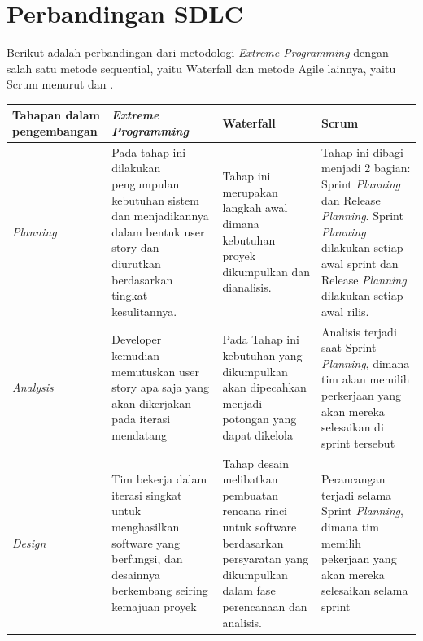 \section{Perbandingan SDLC}

\noindent Berikut adalah perbandingan dari metodologi \textit{Extreme Programming} dengan salah satu metode sequential, yaitu Waterfall dan metode Agile lainnya, yaitu Scrum menurut \textcite{inproc:fahrurrozi} dan \textcite{article:suryantara}. 

\begin{longtable}[!h]
        {
            p{}
            p{}
            p{}
            p{}
        }
        
        \toprule
        Tahapan dalam pengembangan & \textit{Extreme Programming} & Waterfall & Scrum \\ [0.5ex] 
        \midrule
        \textit{Planning} 
        & 
        Pada tahap ini dilakukan pengumpulan kebutuhan sistem dan menjadikannya dalam bentuk user story dan diurutkan berdasarkan tingkat kesulitannya. 
         
        & 
        Tahap ini merupakan langkah awal dimana kebutuhan proyek dikumpulkan dan dianalisis.  
        
        & 
        Tahap ini dibagi menjadi 2 bagian: Sprint \textit{Planning} dan Release \textit{Planning}. Sprint \textit{Planning} dilakukan setiap awal sprint dan Release \textit{Planning} dilakukan setiap awal rilis. 
         
        \\
        \midrule

        \textit{Analysis} 
        & 
        Developer kemudian memutuskan user story apa saja yang akan dikerjakan pada iterasi mendatang 
        & 
        Pada Tahap ini kebutuhan yang dikumpulkan akan dipecahkan menjadi potongan yang dapat dikelola
        
        & 
        Analisis terjadi saat Sprint \textit{Planning}, dimana tim akan memilih perkerjaan yang akan mereka selesaikan di sprint tersebut
        
        \\ 
        \midrule

        \textit{Design} 
        & 
        Tim bekerja dalam iterasi singkat untuk menghasilkan software yang berfungsi, dan desainnya berkembang seiring kemajuan proyek
        & 
        Tahap desain melibatkan pembuatan rencana rinci untuk software berdasarkan persyaratan yang dikumpulkan dalam fase perencanaan dan analisis. 
        & 
        Perancangan terjadi selama Sprint \textit{Planning}, dimana tim memilih pekerjaan yang akan mereka selesaikan selama sprint 
        

\end{longtable}

